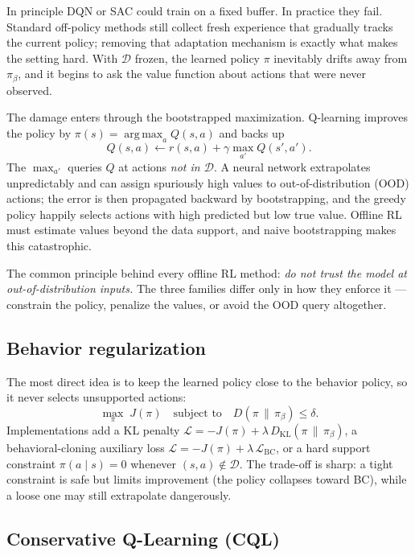 \documentclass[11pt, oneside]{book}
\newcommand{\KL}[2]{D_{\mathrm{KL}}\!\left(#1 \,\|\, #2\right)}
\newcommand{\argmax}{\operatorname*{arg\,max}}
\newcommand{\loss}{\mathcal{L}}          %
\newcommand{\dataset}{\mathcal{D}}       %
\newcommand{\params}{\boldsymbol{\theta}}   %
\begin{document}
In principle DQN or SAC could train on a fixed buffer. In practice they fail. Standard
off-policy methods still collect fresh experience that gradually tracks the current
policy; removing that adaptation mechanism is exactly what makes the setting hard.
With $\dataset$ frozen, the learned policy $\pi$ inevitably drifts away from $\pi_\beta$,
and it begins to ask the value function about actions that were never observed.

The damage enters through the bootstrapped maximization. Q-learning improves the policy
by $\pi(s) = \argmax_a Q(s,a)$ and backs up
\[
  Q(s,a) \leftarrow r(s,a) + \gamma \max_{a'} Q(s', a').
\]
The $\max_{a'}$ queries $Q$ at actions \emph{not in $\dataset$}. A neural network
extrapolates unpredictably and can assign spuriously high values to out-of-distribution
(OOD) actions; the error is then propagated backward by bootstrapping, and the greedy
policy happily selects actions with high predicted but low true value. Offline RL must
estimate values beyond the data support, and naive bootstrapping makes this catastrophic.

\begin{intbox}
The common principle behind every offline RL method: \emph{do not trust the model at
out-of-distribution inputs.} The three families differ only in how they enforce it ---
constrain the policy, penalize the values, or avoid the OOD query altogether.
\end{intbox}

\subsection{Behavior regularization}

The most direct idea is to keep the learned policy close to the behavior policy, so it
never selects unsupported actions:
\[
  \max_\pi\; J(\pi) \quad\text{subject to}\quad D(\pi \,\|\, \pi_\beta) \le \delta.
\]
Implementations add a KL penalty $\loss = -J(\pi) + \lambda\,\KL{\pi}{\pi_\beta}$,
a behavioral-cloning auxiliary loss $\loss = -J(\pi) + \lambda\,\loss_{\text{BC}}$, or a
hard support constraint $\pi(a\mid s) = 0$ whenever $(s,a) \notin \dataset$. The trade-off
is sharp: a tight constraint is safe but limits improvement (the policy collapses toward
BC), while a loose one may still extrapolate dangerously.

\subsection{Conservative Q-Learning (CQL)}
\end{document}
